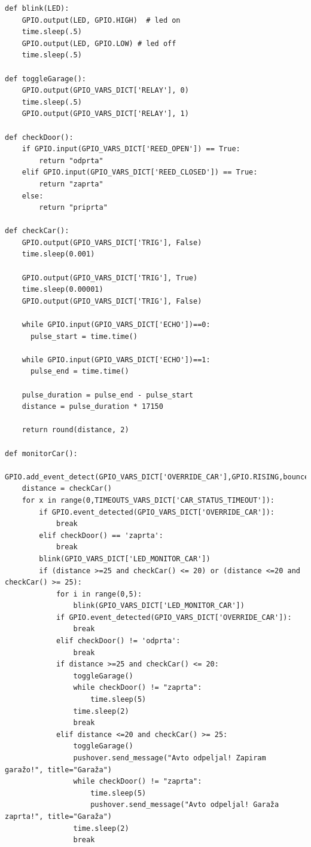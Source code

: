 \documentclass[11pt]{article}
\begin{document}
\begin{verbatim}
def blink(LED):
    GPIO.output(LED, GPIO.HIGH)  # led on
    time.sleep(.5)
    GPIO.output(LED, GPIO.LOW) # led off
    time.sleep(.5)

def toggleGarage():
    GPIO.output(GPIO_VARS_DICT['RELAY'], 0)
    time.sleep(.5)
    GPIO.output(GPIO_VARS_DICT['RELAY'], 1)

def checkDoor():
    if GPIO.input(GPIO_VARS_DICT['REED_OPEN']) == True:
        return "odprta"
    elif GPIO.input(GPIO_VARS_DICT['REED_CLOSED']) == True:
        return "zaprta"
    else:
        return "priprta"

def checkCar():
    GPIO.output(GPIO_VARS_DICT['TRIG'], False)
    time.sleep(0.001)

    GPIO.output(GPIO_VARS_DICT['TRIG'], True)
    time.sleep(0.00001)
    GPIO.output(GPIO_VARS_DICT['TRIG'], False)

    while GPIO.input(GPIO_VARS_DICT['ECHO'])==0:
      pulse_start = time.time()

    while GPIO.input(GPIO_VARS_DICT['ECHO'])==1:
      pulse_end = time.time()

    pulse_duration = pulse_end - pulse_start
    distance = pulse_duration * 17150

    return round(distance, 2)

def monitorCar():
    GPIO.add_event_detect(GPIO_VARS_DICT['OVERRIDE_CAR'],GPIO.RISING,bouncetime=300)
    distance = checkCar()
    for x in range(0,TIMEOUTS_VARS_DICT['CAR_STATUS_TIMEOUT']):
        if GPIO.event_detected(GPIO_VARS_DICT['OVERRIDE_CAR']):
            break
        elif checkDoor() == 'zaprta':
            break
        blink(GPIO_VARS_DICT['LED_MONITOR_CAR'])
        if (distance >=25 and checkCar() <= 20) or (distance <=20 and checkCar() >= 25):
            for i in range(0,5):
                blink(GPIO_VARS_DICT['LED_MONITOR_CAR'])
            if GPIO.event_detected(GPIO_VARS_DICT['OVERRIDE_CAR']):
                break
            elif checkDoor() != 'odprta':
                break
            if distance >=25 and checkCar() <= 20:
                toggleGarage()
                while checkDoor() != "zaprta":
                    time.sleep(5)
                time.sleep(2)
                break
            elif distance <=20 and checkCar() >= 25:
                toggleGarage()
                pushover.send_message("Avto odpeljal! Zapiram garažo!", title="Garaža")
                while checkDoor() != "zaprta":
                    time.sleep(5)
                    pushover.send_message("Avto odpeljal! Garaža zaprta!", title="Garaža")
                time.sleep(2)
                break


\end{verbatim}
\end{document}
